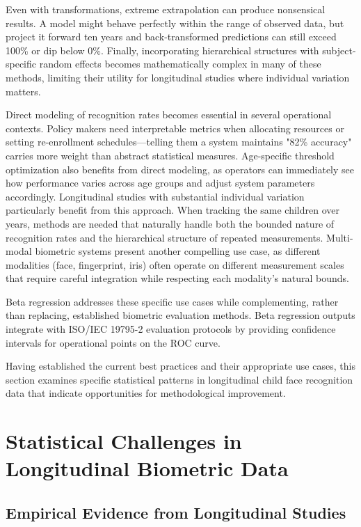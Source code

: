 \documentclass[10pt,journal,compsoc]{IEEEtran}
\begin{document}
Even with transformations, extreme extrapolation can produce nonsensical results. A model might behave perfectly within the range of observed data, but project it forward ten years and back-transformed predictions can still exceed 100\% or dip below 0\%. Finally, incorporating hierarchical structures with subject-specific random effects becomes mathematically complex in many of these methods, limiting their utility for longitudinal studies where individual variation matters.

Direct modeling of recognition rates becomes essential in several operational contexts. Policy makers need interpretable metrics when allocating resources or setting re-enrollment schedules---telling them a system maintains "82\% accuracy" carries more weight than abstract statistical measures. Age-specific threshold optimization also benefits from direct modeling, as operators can immediately see how performance varies across age groups and adjust system parameters accordingly. Longitudinal studies with substantial individual variation particularly benefit from this approach. When tracking the same children over years, methods are needed that naturally handle both the bounded nature of recognition rates and the hierarchical structure of repeated measurements. Multi-modal biometric systems present another compelling use case, as different modalities (face, fingerprint, iris) often operate on different measurement scales that require careful integration while respecting each modality's natural bounds.

Beta regression addresses these specific use cases while complementing, rather than replacing, established biometric evaluation methods. Beta regression outputs integrate with ISO/IEC 19795-2 evaluation protocols by providing confidence intervals for operational points on the ROC curve.

Having established the current best practices and their appropriate use cases, this section examines specific statistical patterns in longitudinal child face recognition data that indicate opportunities for methodological improvement.

\section{Statistical Challenges in Longitudinal Biometric Data}
\label{sec:challenges}

\subsection{Empirical Evidence from Longitudinal Studies}
\end{document}
